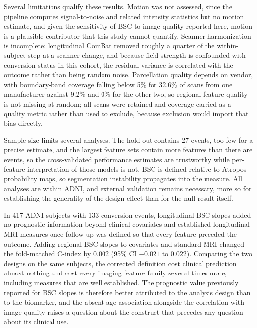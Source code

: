 \documentclass[blue]{ludusofficial}  %
\begin{document}
Several limitations qualify these results. Motion was not assessed, since the pipeline computes signal-to-noise and related intensity statistics but no motion estimate, and given the sensitivity of BSC to image quality reported here, motion is a plausible contributor that this study cannot quantify. Scanner harmonization is incomplete: longitudinal ComBat removed roughly a quarter of the within-subject step at a scanner change, and because field strength is confounded with conversion status in this cohort, the residual variance is correlated with the outcome rather than being random noise. Parcellation quality depends on vendor, with boundary-band coverage falling below 5\% for 32.6\% of scans from one manufacturer against 9.2\% and 0\% for the other two, so regional feature quality is not missing at random; all scans were retained and coverage carried as a quality metric rather than used to exclude, because exclusion would import that bias directly.

Sample size limits several analyses. The hold-out contains 27 events, too few for a precise estimate, and the largest feature sets contain more features than there are events, so the cross-validated performance estimates are trustworthy while per-feature interpretation of those models is not. BSC is defined relative to Atropos probability maps, so segmentation instability propagates into the measure. All analyses are within ADNI, and external validation remains necessary, more so for establishing the generality of the design effect than for the null result itself.

In 417 ADNI subjects with 133 conversion events, longitudinal BSC slopes added no prognostic information beyond clinical covariates and established longitudinal MRI measures once follow-up was defined so that every feature preceded the outcome. Adding regional BSC slopes to covariates and standard MRI changed the fold-matched C-index by 0.002 (95\% CI $-0.021$ to $0.022$). Comparing the two designs on the same subjects, the corrected definition cost clinical prediction almost nothing and cost every imaging feature family several times more, including measures that are well established. The prognostic value previously reported for BSC slopes is therefore better attributed to the analysis design than to the biomarker, and the absent age association alongside the correlation with image quality raises a question about the construct that precedes any question about its clinical use.
\end{document}
